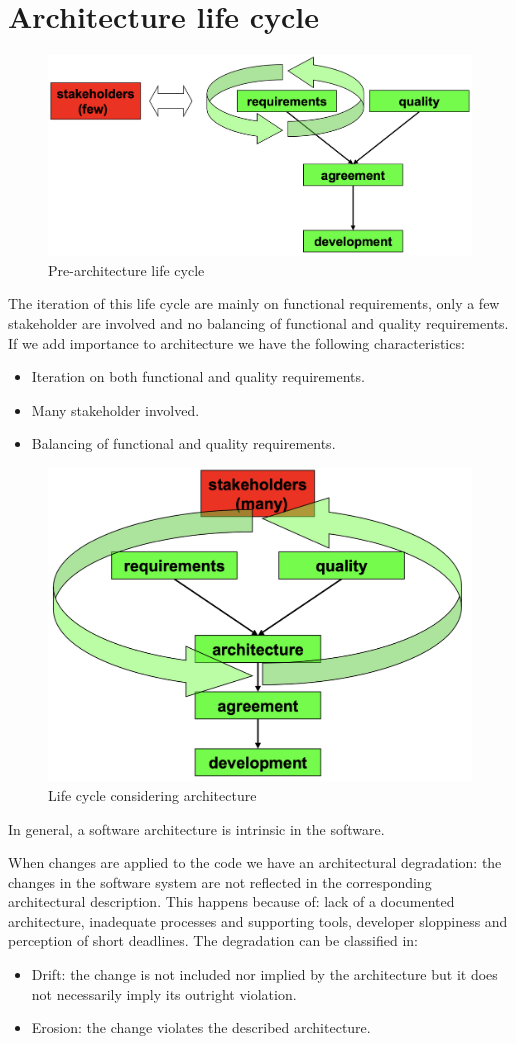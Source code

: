 \documentclass[12pt, a4paper]{report}
\newtheorem[style=M,bodystyle=\normalfont]{theorem}{Theorem}
\newtheorem[style=M,bodystyle=\normalfont]{corollary}{Corollary}
\newtheorem[style=M,bodystyle=\normalfont]{lemma}{Lemma}
\newtheorem[style=M,bodystyle=\normalfont]{definition}{Definition}
\begin{document}
\section{Architecture life cycle}
    \begin{figure}
        \centering
        \includegraphics[width=1\linewidth]{images/archlife.png}
        \caption{Pre-architecture life cycle}
    \end{figure}
    The iteration of this life cycle are mainly on functional requirements, only a few stakeholder are involved and no balancing of functional and quality requirements. If we add importance to architecture we have the following characteristics: 
    \begin{itemize}
        \item Iteration on both functional and quality requirements.
        \item Many stakeholder involved.
        \item Balancing of functional and quality requirements.
    \end{itemize}
    \begin{figure}
        \centering
        \includegraphics[width=0.5\linewidth]{images/archlife_1.png}
        \caption{Life cycle considering architecture}
    \end{figure}
    In general, a software architecture is intrinsic in the software. 
    \par
    When changes are applied to the code we have an architectural degradation: the changes in the software system are not reflected in the corresponding architectural description. This happens because of: lack of a documented architecture, inadequate processes and supporting tools, developer sloppiness and perception of short deadlines. The degradation can be classified in:
    \begin{itemize}
        \item Drift: the change is not included nor implied by the architecture but it does not necessarily imply its outright violation.
        \item Erosion: the change violates the described architecture.
    \end{itemize}
\end{document}
